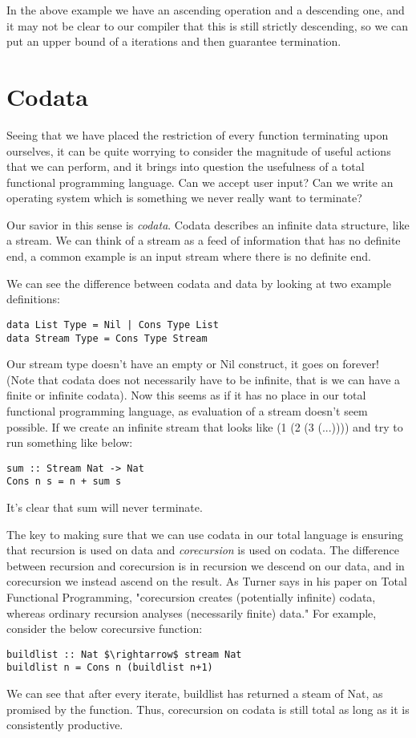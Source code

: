 \documentclass[12pt]{article}
\begin{document}
In the above example we have an ascending operation and a descending one, and it may not be clear to our compiler that this is still strictly descending, so we can put an upper bound of a iterations and then guarantee termination.

\section{Codata}

Seeing that we have placed the restriction of every function terminating upon ourselves, it can be quite worrying to consider the magnitude of useful actions that we can perform, and it brings into question the usefulness of a total functional programming language. Can we accept user input? Can we write an operating system which is something we never really want to terminate?

Our savior in this sense is \emph{codata}. Codata describes an infinite data structure, like a stream. We can think of a stream as a feed of information that has no definite end, a common example is an input stream where there is no definite end.

We can see the difference between codata and data by looking at two example definitions:
\bigskip
\begin{lstlisting}[frame=single,mathescape=true]
data List Type = Nil | Cons Type List
data Stream Type = Cons Type Stream
\end{lstlisting}

Our stream type doesn't have an empty or Nil construct, it goes on forever! (Note that codata does not necessarily have to be infinite, that is we can have a finite or infinite codata). Now this seems as if it has no place in our total functional programming language, as evaluation of a stream doesn't seem possible. If we create an infinite stream that looks like (1 (2 (3 (...)))) and try to run something like below:
\bigskip
\begin{lstlisting}[frame=single,mathescape=true]
sum :: Stream Nat -> Nat
Cons n s = n + sum s
\end{lstlisting}
It's clear that sum will never terminate.

The key to making sure that we can use codata in our total language is ensuring that recursion is used on data and \emph{corecursion} is used on codata. The difference between recursion and corecursion is in recursion we descend on our data, and in corecursion we instead ascend on the result. As Turner says in his paper on Total Functional Programming, "corecursion creates (potentially infinite) codata, whereas ordinary recursion analyses (necessarily finite) data." For example, consider the below corecursive function:
\bigskip
\begin{lstlisting}[frame=single,mathescape=true]
buildlist :: Nat $\rightarrow$ stream Nat
buildlist n = Cons n (buildlist n+1)
\end{lstlisting}
We can see that after every iterate, buildlist has returned a steam of Nat, as promised by the function. Thus, corecursion on codata is still total as long as it is consistently productive.
\end{document}
